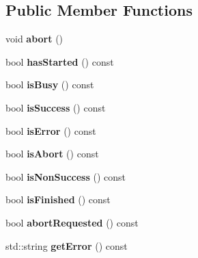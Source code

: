 \subsection*{Public Member Functions}
\begin{DoxyCompactItemize}
\item 
\hypertarget{struct_status_job_a06e0afdd705e4c9873de208a5fc40579}{void {\bfseries abort} ()}\label{struct_status_job_a06e0afdd705e4c9873de208a5fc40579}

\item 
\hypertarget{struct_status_job_ad759e3f36454061c889e6172bb600e3a}{bool {\bfseries has\-Started} () const }\label{struct_status_job_ad759e3f36454061c889e6172bb600e3a}

\item 
\hypertarget{struct_status_job_ace0dda0b3f7e7fb958f970877052ef14}{bool {\bfseries is\-Busy} () const }\label{struct_status_job_ace0dda0b3f7e7fb958f970877052ef14}

\item 
\hypertarget{struct_status_job_a147ccff65fd3e287cff5df61fb0b85c4}{bool {\bfseries is\-Success} () const }\label{struct_status_job_a147ccff65fd3e287cff5df61fb0b85c4}

\item 
\hypertarget{struct_status_job_a9ab1cde6269061b8de7bcf829c8435f5}{bool {\bfseries is\-Error} () const }\label{struct_status_job_a9ab1cde6269061b8de7bcf829c8435f5}

\item 
\hypertarget{struct_status_job_a2bb0bca42f45961de04636eaa680e51e}{bool {\bfseries is\-Abort} () const }\label{struct_status_job_a2bb0bca42f45961de04636eaa680e51e}

\item 
\hypertarget{struct_status_job_abdc7540975bb641ec05ad225cafaf752}{bool {\bfseries is\-Non\-Success} () const }\label{struct_status_job_abdc7540975bb641ec05ad225cafaf752}

\item 
\hypertarget{struct_status_job_a9493c6bbbfc33be95016785b8f979d83}{bool {\bfseries is\-Finished} () const }\label{struct_status_job_a9493c6bbbfc33be95016785b8f979d83}

\item 
\hypertarget{struct_status_job_a48bef51411d1ea0513a452efeb729937}{bool {\bfseries abort\-Requested} () const }\label{struct_status_job_a48bef51411d1ea0513a452efeb729937}

\item 
\hypertarget{struct_status_job_a96846d13ece51fcc292fb8de0f170f42}{std\-::string {\bfseries get\-Error} () const }\label{struct_status_job_a96846d13ece51fcc292fb8de0f170f42}


\end{DoxyCompactItemize}
